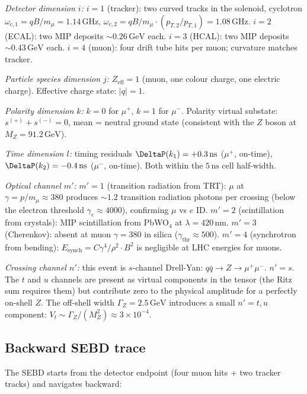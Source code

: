 \documentclass[twocolumn,10pt,a4paper]{article}
\theoremstyle{thmstyle}
\theoremstyle{definition}
\theoremstyle{remark}
\begin{document}
\emph{Detector dimension $i$:}
$i=1$ (tracker): two curved tracks in the solenoid, cyclotron
$\omega_{c,1} = qB/m_\mu = 1.14\,\mathrm{GHz}$,
$\omega_{c,2} = qB/m_\mu\cdot(p_{T,2}/p_{T,1}) = 1.08\,\mathrm{GHz}$.
$i=2$ (ECAL): two MIP deposits $\sim 0.26\,\mathrm{GeV}$ each.
$i=3$ (HCAL): two MIP deposits $\sim 0.43\,\mathrm{GeV}$ each.
$i=4$ (muon): four drift tube hits per muon; curvature matches tracker.

\emph{Particle species dimension $j$:} $Z_\text{eff} = 1$ (muon, one colour
charge, one electric charge).  Effective charge state: $|q| = 1$.

\emph{Polarity dimension $k$:} $k=0$ for $\mu^+$, $k=1$ for $\mu^-$.
Polarity virtual substate: $s^{(+)} + s^{(-)} = 0$, mean = neutral ground state
(consistent with the $Z$ boson at $M_Z = 91.2\,\mathrm{GeV}$).

\emph{Time dimension $l$:} timing residuals
$\DeltaP(k_1) = +0.3\,\mathrm{ns}$ ($\mu^+$, on-time),
$\DeltaP(k_2) = -0.4\,\mathrm{ns}$ ($\mu^-$, on-time).
Both within the $5\,\mathrm{ns}$ cell half-width.

\emph{Optical channel $m'$:}
$m'=1$ (transition radiation from TRT): $\mu$ at $\gamma = p/m_\mu \approx 380$
produces $\sim 1.2$ transition radiation photons per crossing (below the
electron threshold $\gamma_e \approx 4000$), confirming $\mu$ vs $e$ ID.
$m'=2$ (scintillation from crystals): MIP scintillation from PbWO$_4$
at $\lambda = 420\,\mathrm{nm}$.
$m'=3$ (Cherenkov): absent at muon $\gamma = 380$ in silica
($\gamma_\text{thr} \approx 500$).
$m'=4$ (synchrotron from bending): $E_\text{synch} = C\gamma^4/\rho^2 \cdot B^2$
is negligible at LHC energies for muons.

\emph{Crossing channel $n'$:} this event is $s$-channel Drell-Yan:
$q\bar q \to Z \to \mu^+\mu^-$.  $n'=s$.  The $t$ and $u$ channels
are present as virtual components in the tensor (the Ritz sum requires them)
but contribute zero to the physical amplitude for a perfectly on-shell $Z$.
The off-shell width $\Gamma_Z = 2.5\,\mathrm{GeV}$ introduces a small
$n' = t, u$ component: $V_{t} \sim \Gamma_Z/(M_Z^2) \approx 3\times10^{-4}$.

\subsection{Backward SEBD trace}

The SEBD starts from the detector endpoint (four muon hits + two tracker
tracks) and navigates backward:
\end{document}
